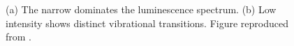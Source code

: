      \begin{figure}[!htb]
   		\begin{subfigure}[t]{ 0.49\linewidth}
   			\centering
   			\caption{}
   		\end{subfigure}
   		\hfill
   		\begin{subfigure}[t]{ 0.49\linewidth}
   			\centering
   			\caption{}
   		\end{subfigure}
   		\caption[Fluorescence spectra of \sivs at room temperature]{(a) The narrow \zpl dominates the luminescence spectrum. (b) Low intensity \psb shows distinct vibrational transitions. Figure reproduced from \cite{Riedrich-moller2014}.}
   		\label{fig::spectral_features}
   	 \end{figure}


